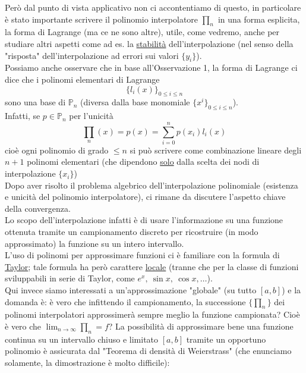 \documentclass[12pt]{article}
\begin{document}
Però dal punto di vista applicativo non ci accontentiamo di questo, in particolare è stato importante scrivere il polinomio interpolatore $\prod_n$ in una forma esplicita, la forma di Lagrange (ma ce ne sono altre), utile, come vedremo, anche per studiare altri aspetti come ad es. la \underline{stabilità} dell'interpolazione (nel
senso della "risposta" dell'interpolazione ad errori sui valori $\{y_i\}$).\\
Possiamo anche osservare che in base all'Osservazione 1, la forma di Lagrange ci dice che i polinomi elementari di Lagrange
\[\{l_i(x)\}_{0 \le i \le n}\]
sono una base di $\mathbb{P}_n$ (diversa dalla base monomiale $\{x^i\}_{0 \le i \le n}$). \\
Infatti, se $p \in \mathbb{P}_n$ per l'unicità
\[\prod_n(x) = p(x) = \sum_{i=0}^n p(x_i) l_i(x)\]
cioè ogni polinomio di grado $\le n$ si può scrivere come combinazione lineare degli $n+1$ polinomi elementari
(che dipendono \underline{solo} dalla scelta dei nodi di interpolazione $\{x_i\}$)
\newline \newline
{}\\
Dopo aver risolto il problema algebrico dell'interpolazione polinomiale (esistenza e unicità del polinomio interpolatore), ci rimane da discutere l'aspetto chiave della convergenza.\\
Lo scopo dell'interpolazione infatti è di usare l'informazione su una funzione ottenuta tramite un campionamento discreto per ricostruire (in modo approssimato)
la funzione su un intero intervallo.\\
L'uso di polinomi per approssimare funzioni ci è familiare con la formula di \underline{Taylor}; tale formula ha però carattere \underline{locale} (tranne che per la classe di funzioni sviluppabili in serie di Taylor, come $e^x,\ \sin{x},\ \cos{x}, \dotso$).\\
Qui invece siamo interessati a un'approssimazione "globale" (su tutto $[a,b]$) e la domanda è: è vero che infittendo il campionamento, la successione $\{\prod_n\}$ dei polinomi interpolatori
approssimerà sempre meglio la funzione campionata? Cioè è vero che $\lim_{n \to \infty} \prod_n = f$? \newline \newline
La possibilità di approssimare bene una funzione continua su un intervallo chiuso e limitato $[a,b]$ tramite un opportuno polinomio è assicurata dal "Teorema di densità di Weierstrass" (che enunciamo solamente, la dimostrazione è molto difficile):
\end{document}
